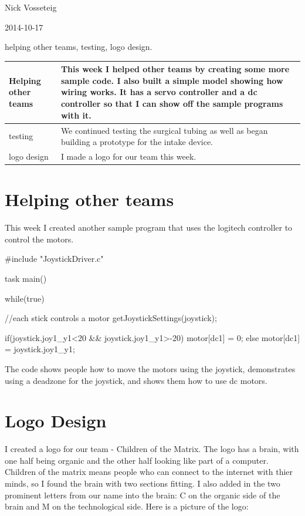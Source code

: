 Nick Vosseteig

2014-10-17

helping other teams, testing, logo design.

\begin{tabular}{|p{5cm}|p{5cm}|}
 \hline
 Helping other teams&
This week I helped other teams by creating some more sample code. I also built a simple model showing how wiring works. It has a servo controller and a dc controller so that I can show off the sample programs with it. 
 \\
 \hline
testing&
We continued testing the surgical tubing as well as began building a prototype for the intake device.
 \\
 \hline
 logo design&
I made a logo for our team this week.
 \\
 \hline
\end{tabular}

\section*{Helping other teams}
This week I created another sample program that uses the logitech controller to control the motors. 
\begin{code}	
#include "JoystickDriver.c"

task main()
{

	while(true)
	{
		//each stick controls a motor
		getJoystickSettings(joystick);

		if(joystick.joy1_y1<20 && joystick.joy1_y1>-20){
			motor[dc1] = 0;
			}else{
			motor[dc1] = joystick.joy1_y1;
		}
	}
}
\end{code}
The code shows people how to move the motors using the joystick, demonstrates using a deadzone for the joystick, and shows them how to use dc motors.

\section*{Logo Design}
I created a logo for our team - Children of the Matrix. The logo has a brain, with one half being organic and the other half looking like part of a computer. Children of the matrix means people who can connect to the internet with thier minds, so I found the brain with two sections fitting. I also added in the two prominent letters from our name into the brain: C on the organic side of the brain and M on the technological side.
Here is a picture of the logo:


